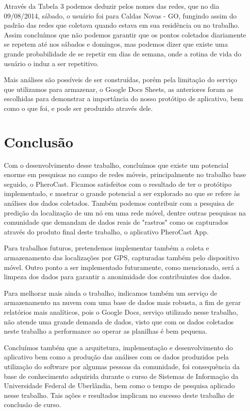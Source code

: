 \documentclass[12pt, %
openright, 
oneside,
a4paper,
brazil]{facom-ufu-abntex2}
\begin{document}
Através da Tabela 3 podemos deduzir pelos nomes das redes, que no dia 09/08/2014, sábado, o usuário foi para Caldas Novas - GO, fungindo assim do padrão das redes que coletava quando estava em sua residência ou no trabalho. Assim concluímos que não podemos garantir que os pontos coletados diariamente se repetem até nos sábados e domingos, mas podemos dizer que existe uma grande probabilidade de se repetir em dias de semana, onde a rotina de vida do usuário o induz a ser repetitivo.


Mais análises são possíveis de ser construídas, porém pela limitação do serviço que utilizamos para armazenar, o Google Docs Sheets, as anteriores foram as escolhidas para demonstrar a importância do nosso protótipo de aplicativo, bem como o que foi, e pode ser produzido através dele.



\chapter{Conclusão}


Com o desenvolvimento desse trabalho, concluímos que existe um potencial enorme em pesquisas no campo de redes móveis, principalmente no trabalho base seguido, o PheroCast. Ficamos satisfeitos com o resultado de ter o protótipo implementado, e mostrar o grande potencial a ser explorado no que se refere às análises dos dados coletados. Também podemos contribuir com a pesquisa de predição da localização de um nó em uma rede móvel, dentre outras pesquisas na comunidade que demandam de dados reais de "rastros" como os capturados através do produto final deste trabalho, o aplicativo PheroCast App.


Para trabalhos futuros, pretendemos implementar também a coleta e armazenamento das localizações por GPS, capturadas também pelo dispositivo móvel. Outro ponto a ser implementado futuramente, como mencionado, será a limpeza dos dados para garantir a anonimidade dos contribuintes dos dados.

Para melhorar mais ainda o trabalho, indicamos também um serviço de armazenamento na nuvem com uma base de dados mais robusta, a fim de gerar relatórios mais analíticos, pois o Google Docs, serviço utilizado nesse trabalho, não atende uma grande demanda de dados, visto que com os dados coletados neste trabalho a performance ao operar as planilhas é bem pequena. 

Concluímos também que a arquitetura, implementação e desenvolvimento do aplicativo bem como a produção das análises com os dados produzidos pela utilização do software por algumas pessoas da comunidade, foi consequência da base de conhecimento adquirida durante o curso de Sistemas de Informação da Universidade Federal de Uberlândia, bem como o tempo de pesquisa aplicado nesse trabalho. Tais ações e resultados implicam no sucesso deste trabalho de conclusão de curso.
\end{document}
